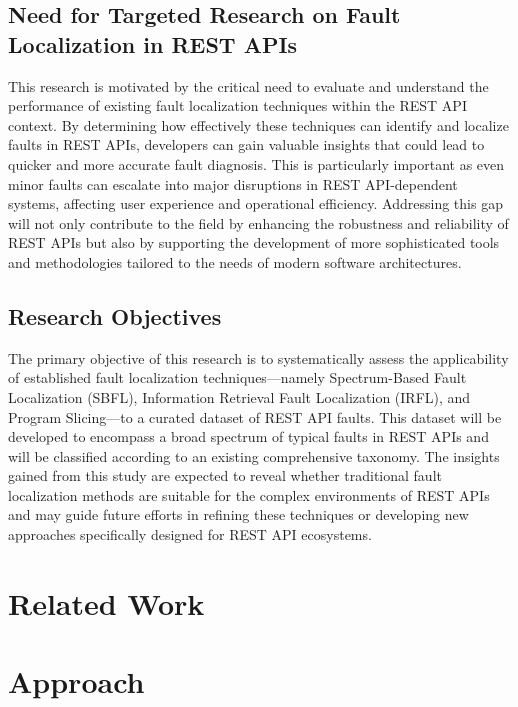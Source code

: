 \documentclass[conference]{IEEEtran}
\newcommand{\todo}[1]{\textcolor{red}{{\bfseries [[#1]]}}}
\begin{document}
\subsection{Need for Targeted Research on Fault Localization in REST APIs}
This research is motivated by the critical need to evaluate and understand the performance of existing fault localization techniques within the REST API context. 
By determining how effectively these techniques can identify and localize faults in REST APIs, developers can gain valuable insights that could lead to quicker and more accurate fault diagnosis. This is particularly important as even minor faults can escalate into major disruptions in REST API-dependent systems, affecting user experience and operational efficiency. Addressing this gap will not only contribute to the field by enhancing the robustness and reliability of REST APIs but also by supporting the development of more sophisticated tools and methodologies tailored to the needs of modern software architectures.


\subsection{Research Objectives}
The primary objective of this research is to systematically assess the applicability of established fault localization techniques—namely 
Spectrum-Based Fault Localization (SBFL), Information Retrieval Fault Localization (IRFL), and Program Slicing—to a curated dataset of REST API faults. 
This dataset will be developed to encompass a broad spectrum of typical faults in REST APIs and will be classified according to an existing comprehensive taxonomy. 
The insights gained from this study are expected to reveal whether traditional fault localization methods are suitable for the complex environments of REST APIs and may guide future efforts in refining these techniques or developing new approaches specifically designed for REST API ecosystems.




\section{Related Work}
\label{sec:relatedwork}

\section{Approach}
\label{sec:approach}
\end{document}

